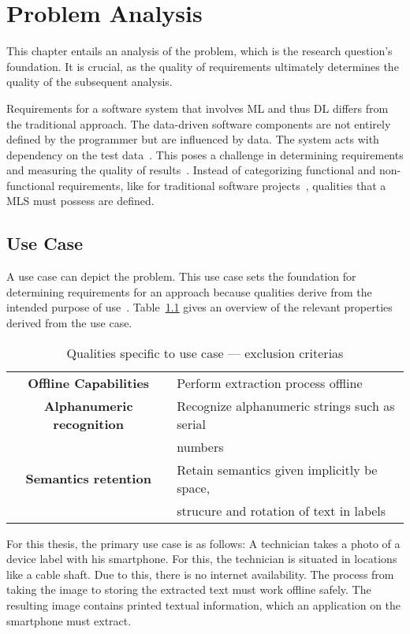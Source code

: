 \chapter{Problem Analysis}\label{ch:problem}
This chapter entails an analysis of the problem, which is the research question's foundation.
It is crucial, as the quality of requirements ultimately determines the quality of the
subsequent analysis.

Requirements for a software system that involves \ac{ML} and thus \ac{DL} differs from
the traditional approach. The data-driven software components are not entirely defined by the
programmer but are influenced by data.
The system acts with dependency on the test data~\citep{siebert_construction_2021}.
This poses a challenge in determining requirements and measuring the quality of
results~\citep{nakamichi_requirements-driven_2020}.
Instead of categorizing functional and non-functional requirements, like for traditional
software projects~\citep{zowghi_requirements_2014}, qualities that a \ac{MLS} must possess
are defined.

\section{Use Case}
A use case can depict the problem.
This use case sets the foundation for determining requirements for an
approach because qualities derive from the intended purpose of
use~\citep{siebert_construction_2021}.
Table~\ref{tb:useCaseQualities} gives an overview of the relevant properties derived
from the use case.
\begin{table}[ht]
    \centering\scriptsize
    \begin{tabular}{c l}
        \textbf{Offline Capabilities} & Perform extraction process offline \\
        \textbf{Alphanumeric recognition}    & Recognize alphanumeric strings such as serial \\
                                    & numbers \\
        \textbf{Semantics retention} & Retain semantics given implicitly be space, \\
                            & strucure and rotation of text in labels \\
    \end{tabular}
    \caption{Qualities specific to use case --- exclusion criterias\label{tb:useCaseQualities}}
\end{table}
For this thesis, the primary use case is as follows:
A technician takes a photo of a device label with his smartphone.
For this, the technician is situated in locations like a cable shaft.
Due to this, there is no internet availability.
The process from taking the image to storing the extracted text must work offline safely.
The resulting image contains printed textual information, which an application on the smartphone must
extract.

